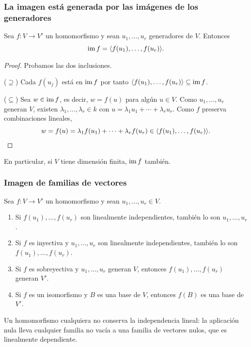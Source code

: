\begin{frame}
    \frametitle{La imagen está generada por las imágenes de los generadores}

    \begin{proposition}
        Sea $f\colon V\to V'$ un homomorfismo y sean $u_1,\ldots,u_r$
        generadores de $V$. Entonces
        \[
            \operatorname{im} f=\langle f(u_1),\ldots,f(u_r)\rangle.
        \]
    \end{proposition}

    \begin{proof}
        Probamos las dos inclusiones.

        ($\supseteq$) Cada $f(u_j)$ está en $\operatorname{im} f$ por tanto 
        $\langle f(u_1),\ldots,f(u_r)\rangle\subseteq\operatorname{im} f$.

        ($\subseteq$) Sea $w\in\operatorname{im} f$, es decir, $w=f(u)$ para algún
        $u\in V$. Como $u_1,\ldots,u_r$ generan $V$, existen
        $\lambda_1,\ldots,\lambda_r\in k$ con
        $u=\lambda_1u_1+\cdots+\lambda_ru_r$. Como $f$ preserva
        combinaciones lineales,
        \[
            w=f(u)=\lambda_1f(u_1)+\cdots+\lambda_rf(u_r)
            \in\langle f(u_1),\ldots,f(u_r)\rangle.\qedhere
        \]
    \end{proof}

    \medskip

    En particular, si $V$ tiene dimensión finita, $\operatorname{im} f$ también.
\end{frame}


\begin{frame}
    \frametitle{Imagen de familias de vectores}

    \begin{proposition}
        Sea $f\colon V\to V'$ un homomorfismo y sean $u_1,\ldots,u_r\in V$.
        \begin{enumerate}[(1)]
            \item Si $f(u_1),\ldots,f(u_r)$ son linealmente independientes,
            también lo son $u_1,\ldots,u_r$.
            \item Si $f$ es inyectiva y $u_1,\ldots,u_r$ son linealmente
            independientes, también lo son $f(u_1),\ldots,f(u_r)$.
            \item Si $f$ es sobreyectiva y $u_1,\ldots,u_r$ generan $V$,
            entonces $f(u_1),\ldots,f(u_r)$ generan $V'$.
            \item Si $f$ es un isomorfismo y $B$ es una base de $V$,
            entonces $f(B)$ es una base de $V'$.
        \end{enumerate}
    \end{proposition}

    \medskip

    Un homomorfismo cualquiera \alert{no} conserva la independencia
    lineal: la aplicación nula lleva cualquier familia no vacía a una familia de
    vectores nulos, que es linealmente dependiente.
\end{frame}


